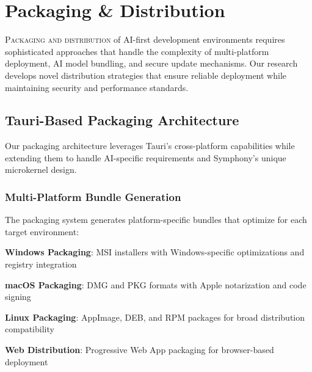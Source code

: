 
\section*{Packaging \& Distribution}

\lettrine{P}{ackaging and distribution} of AI-first development environments requires sophisticated approaches that handle the complexity of multi-platform deployment, AI model bundling, and secure update mechanisms. Our research develops novel distribution strategies that ensure reliable deployment while maintaining security and performance standards.

\subsection*{Tauri-Based Packaging Architecture}

Our packaging architecture leverages Tauri's cross-platform capabilities while extending them to handle AI-specific requirements and Symphony's unique microkernel design.

\subsubsection*{Multi-Platform Bundle Generation}

The packaging system generates platform-specific bundles that optimize for each target environment:

\begin{expandedlist}
    \item \textbf{Windows Packaging}: MSI installers with Windows-specific optimizations and registry integration
    \item \textbf{macOS Packaging}: DMG and PKG formats with Apple notarization and code signing
    \item \textbf{Linux Packaging}: AppImage, DEB, and RPM packages for broad distribution compatibility
    \item \textbf{Web Distribution}: Progressive Web App packaging for browser-based deployment
\end{expandedlist}

